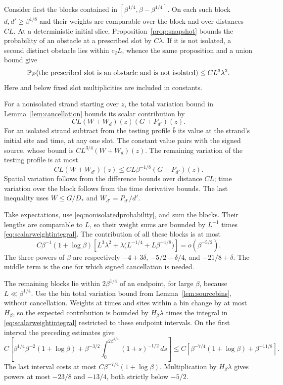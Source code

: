 Consider first the blocks contained in
$[\beta^{1/4},\beta-\beta^{1/4}]$.  On each such block
$d,d'\ge\beta^{1/8}$ and their weights are comparable over the block
and over distances $CL$.  At a deterministic initial slice,
Proposition~\ref{prop:snapshot} bounds the probability of an obstacle
at a prescribed slot by $C\lambda$.  If it is not isolated, a second
distinct obstacle lies within $c_2L$, whence the same proposition and
a union bound give
\begin{equation}\label{eq:nonisolatedprobability}
 \mathbb P_P(\text{the prescribed slot is an obstacle and is not isolated})
                       \le CL^3\lambda^2.
\end{equation}
Here and below fixed slot multiplicities are included in constants.

For a nonisolated strand starting over $z$, the total variation
bound in Lemma~\ref{lem:cancellation} bounds its scalar contribution
by
\[
 CL(W+W_d)(z)(G+P_{d'})(z).
\]
For an isolated strand subtract from the testing profile $\bar b$
its value at the strand's initial site and time, at any one slot.
The constant value pairs with the signed source, whose bound is
$CL^{3/4}(W+W_d)(z)$.  The remaining variation of the testing profile
is at most
\begin{equation}\label{eq:profilevariation}
 CL(W+W_{d'})(z)
 \le C L\beta^{-1/8}(G+P_{d'})(z).
\end{equation}
Spatial variation follows from the difference bounds over distance
$CL$; time variation over the block follows from the time derivative
bounds.  The last inequality uses $W\le G/D_*$ and
$W_{d'}=P_{d'}/d'$.

Take expectations, use \eqref{eq:nonisolatedprobability}, and sum the
blocks.  Their lengths are comparable to $L$, so their weight sums
are bounded by $L^{-1}$ times
\eqref{eq:scalarweightintegral}.  The contribution of all these
blocks is at most
\begin{equation}\label{eq:centralfirstterm}
 C\beta^{-1}(1+\log\beta)
   \left[L^3\lambda^2
          +\lambda\bigl(L^{-1/4}+L\beta^{-1/8}\bigr)\right]
                         =o(\beta^{-5/2}).
\end{equation}
The three powers of $\beta$ are respectively
$-4+3\delta$, $-5/2-\delta/4$, and $-21/8+\delta$.
The middle term is the one for which signed cancellation is needed.

The remaining blocks lie within $2\beta^{1/4}$ of an endpoint, for
large $\beta$, because $L\ll\beta^{1/4}$.  Use the bin total
variation bound from Lemma~\ref{lem:sourcebins}, without cancellation.
Weights at times and sites within a bin change by at most $H_\beta$,
so the expected contribution is bounded by $H_\beta\lambda$ times
the integral in \eqref{eq:scalarweightintegral} restricted to these
endpoint intervals.  On the first interval the preceding estimates
give
\[
 C\left[\beta^{1/4}\beta^{-2}(1+\log\beta)
       +\beta^{-3/2}\int_0^{2\beta^{1/4}}
                              (1+s)^{-1/2}\,ds\right]
 \le C\left[\beta^{-7/4}(1+\log\beta)+\beta^{-11/8}\right].
\]
The last interval costs at most
$C\beta^{-7/4}(1+\log\beta)$.  Multiplication by
$H_\beta\lambda$ gives powers at most $-23/8$ and $-13/4$,
both strictly below $-5/2$.

